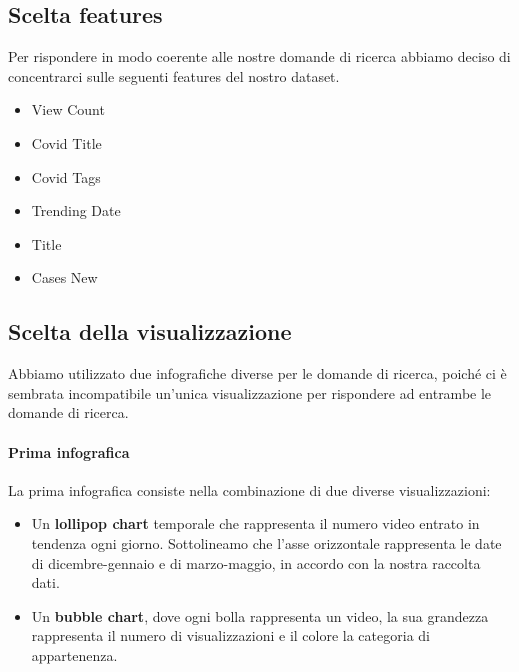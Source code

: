 \documentclass[10pt, a4paper,openany]{article}
\begin{document}
\subsection*{Scelta features}
Per rispondere in modo coerente alle nostre domande di ricerca abbiamo deciso di concentrarci sulle seguenti features del nostro dataset.
\begin{itemize}
	\item View Count
	\item Covid Title
	\item Covid Tags
	\item Trending Date
	\item Title
	\item Cases New
\end{itemize}

\subsection*{Scelta della visualizzazione}

Abbiamo utilizzato due infografiche diverse per le domande di ricerca, poiché ci è sembrata incompatibile un'unica visualizzazione per rispondere ad entrambe le domande di ricerca.


\paragraph{Prima infografica} La prima infografica consiste nella combinazione di due diverse visualizzazioni:
\begin{itemize}
	\item Un \textbf{lollipop chart} temporale che rappresenta il numero video entrato in tendenza ogni giorno. Sottolineamo che l'asse orizzontale rappresenta le date di dicembre-gennaio e di marzo-maggio, in accordo con la nostra raccolta dati.
	\item Un \textbf{bubble chart}, dove ogni bolla rappresenta un video, la sua grandezza rappresenta il numero di visualizzazioni e il colore la categoria di appartenenza.
\end{itemize}
\end{document}
